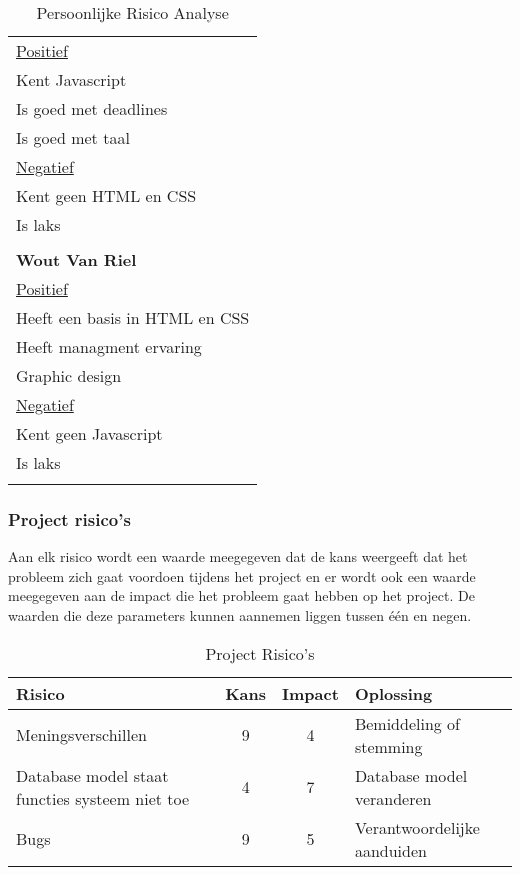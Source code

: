 \begin{longtable}{l}
  \hline
  \underline{Positief} \\
  Kent Javascript \\
  Is goed met deadlines \\
  Is goed met taal \\
  \underline{Negatief} \\
  Kent geen HTML en CSS \\
  Is laks \\
\\
  \textbf{Wout Van Riel} \\
  \hline
  \underline{Positief} \\
  Heeft een basis in HTML en CSS \\
  Heeft managment ervaring \\
  Graphic design \\
  \underline{Negatief} \\
  Kent geen Javascript \\
  Is laks \\
 
\caption{Persoonlijke Risico Analyse}
\label{tab:pra}
\end{longtable}

\subsubsection{Project risico's}

Aan elk risico wordt een waarde meegegeven dat de kans weergeeft dat het probleem zich gaat voordoen tijdens het project en er wordt ook een waarde meegegeven aan de impact die het probleem gaat hebben op het project. De waarden die deze parameters kunnen aannemen liggen tussen één en negen.

\begin{table}[h]
\centering
\begin{tabular}{l|c|c|l}
Risico & Kans & Impact & Oplossing  \\
\hline
 Meningsverschillen & 9 & 4 & Bemiddeling of stemming \\
 Database model staat functies systeem niet toe & 4 & 7 & Database model veranderen \\
 Bugs & 9 & 5 & Verantwoordelijke aanduiden
\end{tabular}
\caption{Project Risico's}
\label{tab:projris}
\end{table}

